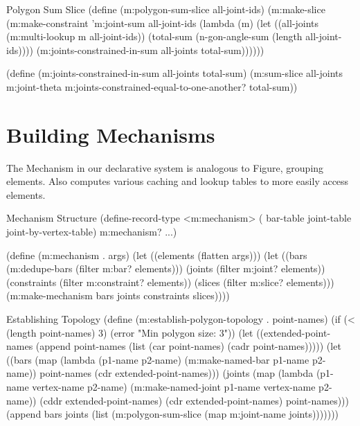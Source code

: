\begin{code-listing}
[label=poly-sum-slice]
{Polygon Sum Slice}
(define (m:polygon-sum-slice all-joint-ids)
  (m:make-slice
   (m:make-constraint 'm:joint-sum all-joint-ids
    (lambda (m)
      (let ((all-joints (m:multi-lookup m all-joint-ids))
            (total-sum (n-gon-angle-sum (length all-joint-ids))))
        (m:joints-constrained-in-sum all-joints total-sum))))))

(define (m:joints-constrained-in-sum all-joints total-sum)
  (m:sum-slice all-joints m:joint-theta
   m:joints-constrained-equal-to-one-another? total-sum))
\end{code-listing}

\section{Building Mechanisms}

The Mechanism in our declarative system is analogous to Figure,
grouping elements. Also computes various caching and lookup tables to
more easily access elements.

\begin{code-listing}
[label=mechanism-struct]
{Mechanism Structure}
(define-record-type <m:mechanism>
    (%
                       bar-table joint-table joint-by-vertex-table)
    m:mechanism? ...)

(define (m:mechanism . args)
  (let ((elements (flatten args)))
    (let ((bars (m:dedupe-bars (filter m:bar? elements)))
          (joints (filter m:joint? elements))
          (constraints (filter m:constraint? elements))
          (slices (filter m:slice? elements)))
      (m:make-mechanism bars joints constraints slices))))
\end{code-listing}

\begin{code-listing}
[label=est-topo]
{Establishing Topology}
(define (m:establish-polygon-topology . point-names)
  (if (< (length point-names) 3)
      (error "Min polygon size: 3"))
  (let ((extended-point-names
         (append point-names (list (car point-names) (cadr point-names)))))
    (let ((bars (map (lambda (p1-name p2-name)
                       (m:make-named-bar p1-name p2-name))
                     point-names
                     (cdr extended-point-names)))
          (joints (map (lambda (p1-name vertex-name p2-name)
                         (m:make-named-joint p1-name vertex-name p2-name))
                       (cddr extended-point-names)
                       (cdr extended-point-names)
                       point-names)))
      (append bars joints
              (list (m:polygon-sum-slice (map m:joint-name joints)))))))
\end{code-listing}

